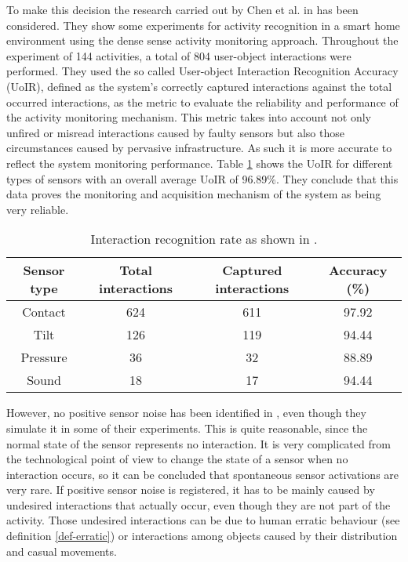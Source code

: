 To make this decision the research carried out by Chen et al. in \cite{Chen2012a} has been considered. They show some experiments for activity recognition in a smart home environment using the dense sense activity monitoring approach. Throughout the experiment of 144 activities, a total of 804 user-object interactions were performed. They used the so called User-object Interaction Recognition Accuracy (UoIR), defined as the system’s correctly captured interactions against the total occurred interactions, as the metric to evaluate the reliability and performance of the activity monitoring mechanism. This metric takes into account not only unfired or misread interactions caused by faulty sensors but also those circumstances caused by pervasive infrastructure. As such it is more accurate to reflect the system monitoring performance. Table \ref{tab-sensor-errors} shows the UoIR for different types of sensors with an overall average UoIR of 96.89\%. They conclude that this data proves the monitoring and acquisition mechanism of the system as being very reliable.

\begin{table}[htbp]\scriptsize
\begin{center}
 \begin{tabular}{cccc}
  \hline
  Sensor type & Total interactions & Captured interactions & Accuracy (\%) \\
  \hline
  Contact & 624 & 611 & 97.92 \\
  Tilt & 126 & 119 & 94.44 \\
  Pressure & 36 & 32 & 88.89 \\
  Sound & 18 & 17 & 94.44 \\
  \hline
 \end{tabular}
 \caption{Interaction recognition rate as shown in \cite{Chen2012a}.}
 \label{tab-sensor-errors}
\end{center} 
\end{table}

However, no positive sensor noise has been identified in \cite{Chen2012a}, even though they simulate it in some of their experiments. This is quite reasonable, since the normal state of the sensor represents no interaction. It is very complicated from the technological point of view to change the state of a sensor when no interaction occurs, so it can be concluded that spontaneous sensor activations are very rare. If positive sensor noise is registered, it has to be mainly caused by undesired interactions that actually occur, even though they are not part of the activity. Those undesired interactions can be due to human erratic behaviour (see definition \ref{def-erratic}) or interactions among objects caused by their distribution and casual movements. 

